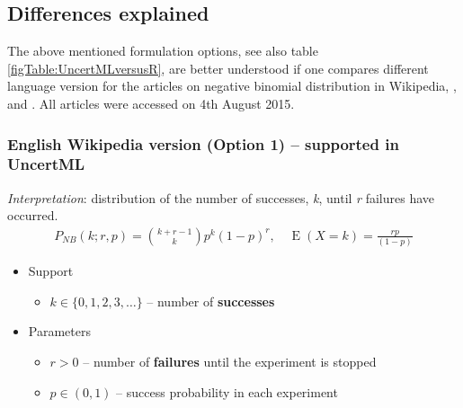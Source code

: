 \subsection*{Differences explained}
The above mentioned formulation options, see also table \ref{figTable:UncertMLversusR}, 
are better understood if one compares different language version for the articles on negative 
binomial distribution in Wikipedia, \cite{enWikipedia:2015}, \cite{frWikipedia:2015} and  \cite{gerWikipedia:2015}.
All articles were accessed on 4th August 2015.

\subsubsection*{English Wikipedia version (Option 1) -- supported in UncertML}
\textit{Interpretation}: distribution of the number of successes, \emph{k}, until \emph{r} failures have occurred.
\begin{align*}
P_{N\!B}(k;r,p) = {k + r - 1 \choose k} p^k (1-p)^r, \quad \operatorname E(X\!=\!k)=\frac{rp}{(1-p)}
\end{align*}
\begin{itemize}
\item 
Support
\begin{itemize}
\item 
$k \in \{ 0, 1, 2, 3, \dots\}$ -- number of \textbf{successes}
\end{itemize}
\item 
Parameters 
\begin{itemize}
\item 
$r > 0$ -- number of \textbf{failures} until the experiment is stopped
\item 
$p \in (0,1)$ -- success probability in each experiment
\end{itemize}
\end{itemize}

